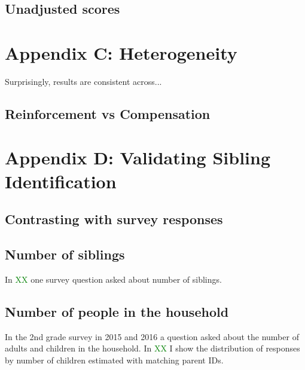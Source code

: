 \subsection{Unadjusted scores}


\clearpage


\setcounter{figure}{0}
\renewcommand\thefigure{C.\arabic{figure}}    

\setcounter{table}{0}
\renewcommand{\thetable}{C.\arabic{table}}
\setcounter{subsection}{0}

\section*{Appendix C: Heterogeneity} \label{sec:appC}

Surprisingly, results are consistent across...

\subsection{Reinforcement vs Compensation}



\clearpage

\setcounter{figure}{0}
\renewcommand\thefigure{D.\arabic{figure}}    

\setcounter{table}{0}
\renewcommand{\thetable}{D.\arabic{table}}
\setcounter{subsection}{0}

\section*{Appendix D: Validating Sibling Identification} \label{sec:appD}

\subsection{Contrasting with survey responses}


\subsection{Number of siblings}

In \textcolor{green}{XX} one survey question asked about number of siblings.


\subsection{Number of people in the household}

In the 2nd grade survey in 2015 and 2016 a question asked about the number of adults and children in the household. In \textcolor{green}{XX} I show the distribution of responses by number of children estimated with matching parent IDs. 

